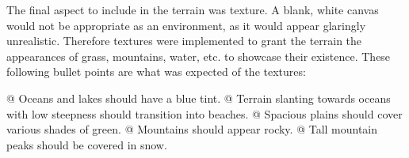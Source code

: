 The final aspect to include in the terrain was texture.
A blank, white canvas would not be appropriate as an environment, as it would appear glaringly unrealistic.
Therefore textures were implemented to grant the terrain the appearances of grass, mountains, water, etc. to showcase their existence.
These following bullet points are what was expected of the textures:

\begin{easylist}
 @ Oceans and lakes should have a blue tint.
 @ Terrain slanting towards oceans with low steepness should transition into beaches.
 @ Spacious plains should cover various shades of green.
 @ Mountains should appear rocky.
 @ Tall mountain peaks should be covered in snow.
\end{easylist}

